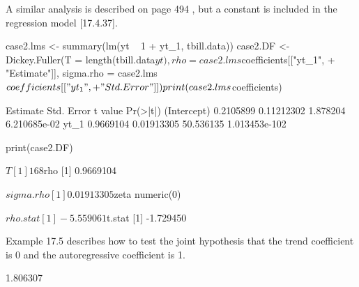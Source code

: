 \documentclass[a4paper]{article}
\renewcommand{\~}{\perispomeni}%
\begin{document}
A similar analysis is described on page 494 , but a constant is included in the regression model [17.4.37].
\begin{Schunk}
\begin{Sinput}
 case2.lms <- summary(lm(yt ~ 1 + yt_1, tbill.data))
 case2.DF <- Dickey.Fuller(T = length(tbill.data$yt), rho = case2.lms$coefficients[["yt_1", 
+     "Estimate"]], sigma.rho = case2.lms$coefficients[["yt_1", 
+     "Std. Error"]])
 print(case2.lms$coefficients)
\end{Sinput}
\begin{Soutput}
             Estimate Std. Error   t value      Pr(>|t|)
(Intercept) 0.2105899 0.11212302  1.878204  6.210685e-02
yt_1        0.9669104 0.01913305 50.536135 1.013453e-102
\end{Soutput}
\begin{Sinput}
 print(case2.DF)
\end{Sinput}
\begin{Soutput}
$T
[1] 168

$rho
[1] 0.9669104

$sigma.rho
[1] 0.01913305

$zeta
numeric(0)

$rho.stat
[1] -5.559061

$t.stat
[1] -1.729450
\end{Soutput}
\end{Schunk}
Example 17.5 describes how to test the joint hypothesis that the trend coefficient is 0 and the autoregressive
coefficient is 1.
\begin{Schunk}
\begin{Soutput}
[1] 1.806307
\end{Soutput}
\end{Schunk}
\end{document}
